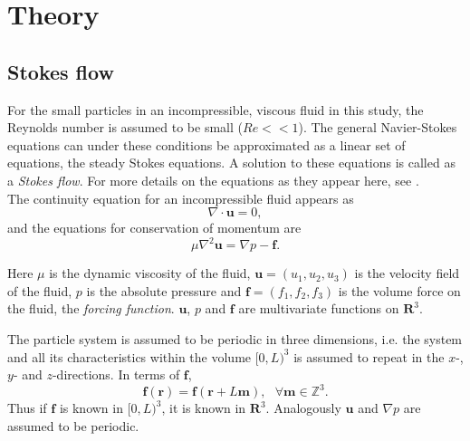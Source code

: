 \documentclass[a4paper,
twoside=false,abstract=false,numbers=noenddot,
titlepage=false,headings=small,parskip=half,version=last]{scrartcl}
\begin{document}
\section{Theory}
\subsection{Stokes flow}
For the small particles in an incompressible, viscous fluid in this study, the Reynolds number is assumed to be small ($Re<<1$). The general Navier-Stokes equations can under these conditions be approximated as a linear set of equations, the steady Stokes equations. A solution to these equations is called as a \emph{Stokes flow}. For more details on the equations as they appear here, see \cite{guazzellibook}.\\
The continuity equation for an incompressible fluid appears as
\begin{equation}
\nabla \cdot \mathbf{u} = 0, \label{eq:incompressible}
\end{equation}
and the equations for conservation of momentum are
\begin{equation}
\mu \nabla^2 \mathbf{u} = \nabla p - \mathbf{f}. \label{eq:stokesequations}
\end{equation}

Here $\mu$ is the dynamic viscosity of the fluid, $\mathbf{u}=(u_1,u_2,u_3)$ is the velocity field of the fluid, $p$ is the absolute pressure and $\mathbf{f}=(f_1,f_2,f_3)$ is the volume force on the fluid, the \emph{forcing function}. $\mathbf{u}$, $p$ and $\mathbf{f}$ are multivariate functions on $\mathbf{R}^3$.

The particle system is assumed to be periodic in three dimensions, i.e. the system and all its characteristics within the volume $[0,L)^3$ is assumed to repeat in the $x$-,$y$- and $z$-directions.
In terms of $\mathbf{f}$,
\begin{equation}
\mathbf{f}(\mathbf{r}) = \mathbf{f}(\mathbf{r}+L\mathbf{m}),\text{ }\forall \mathbf{m} \in \mathbb{Z}^3.
\end{equation}
Thus if $\mathbf{f}$ is known in $[0,L)^3$, it is known in $\mathbf{R}^3$. Analogously $\mathbf{u}$ and $\nabla p$ are assumed to be periodic.
\end{document}
